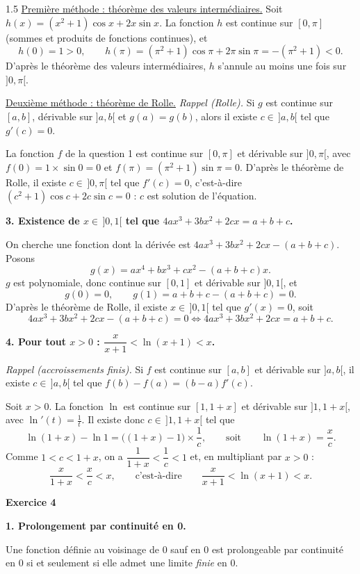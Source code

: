 \documentclass[12pt]{article}
\begin{document}
\begin{spacing}{1.5}
\underline{Première méthode : théorème des valeurs intermédiaires.}
Soit $h(x)=(x^2+1)\cos x+2x\sin x$. La fonction $h$ est continue sur $[0,\pi]$ (sommes et produits de fonctions continues), et
\[
h(0)=1>0,\qquad h(\pi)=(\pi^2+1)\cos\pi+2\pi\sin\pi=-(\pi^2+1)<0 .
\]
D'après le théorème des valeurs intermédiaires, $h$ s'annule au moins une fois sur $]0,\pi[$.

\underline{Deuxième méthode : théorème de Rolle.}
\emph{Rappel (Rolle).} Si $g$ est continue sur $[a,b]$, dérivable sur $]a,b[$ et $g(a)=g(b)$, alors il existe $c\in\,]a,b[$ tel que $g'(c)=0$.

La fonction $f$ de la question 1 est continue sur $[0,\pi]$ et dérivable sur $]0,\pi[$, avec $f(0)=1\times\sin0=0$ et $f(\pi)=(\pi^2+1)\sin\pi=0$. D'après le théorème de Rolle, il existe $c\in\,]0,\pi[$ tel que $f'(c)=0$, c'est-à-dire $(c^2+1)\cos c+2c\sin c=0$ : $c$ est solution de l'équation.

\textbf{3. Existence de $x\in\,]0,1[$ tel que $4ax^3+3bx^2+2cx=a+b+c$.}

On cherche une fonction dont la dérivée est $4ax^3+3bx^2+2cx-(a+b+c)$. Posons
\[
g(x)=ax^4+bx^3+cx^2-(a+b+c)x .
\]
$g$ est polynomiale, donc continue sur $[0,1]$ et dérivable sur $]0,1[$, et
\[
g(0)=0,\qquad g(1)=a+b+c-(a+b+c)=0 .
\]
D'après le théorème de Rolle, il existe $x\in\,]0,1[$ tel que $g'(x)=0$, soit
\[
4ax^3+3bx^2+2cx-(a+b+c)=0\iff 4ax^3+3bx^2+2cx=a+b+c .
\]

\textbf{4. Pour tout $x>0$ : $\dfrac{x}{x+1}<\ln(x+1)<x$.}

\emph{Rappel (accroissements finis).} Si $f$ est continue sur $[a,b]$ et dérivable sur $]a,b[$, il existe $c\in\,]a,b[$ tel que $f(b)-f(a)=(b-a)f'(c)$.

Soit $x>0$. La fonction $\ln$ est continue sur $[1,1+x]$ et dérivable sur $]1,1+x[$, avec $\ln'(t)=\frac1t$. Il existe donc $c\in\,]1,1+x[$ tel que
\[
\ln(1+x)-\ln1=\big((1+x)-1\big)\times\frac1c,\qquad\text{soit}\qquad \ln(1+x)=\frac{x}{c}.
\]
Comme $1<c<1+x$, on a $\dfrac1{1+x}<\dfrac1c<1$ et, en multipliant par $x>0$ :
\[
\frac{x}{1+x}<\frac xc<x,\qquad\text{c'est-à-dire}\qquad\boxed{\frac{x}{x+1}<\ln(x+1)<x}.
\]

\medskip\textbf{Exercice 4}

\textbf{1. Prolongement par continuité en 0.}

Une fonction définie au voisinage de $0$ sauf en $0$ est prolongeable par continuité en $0$ si et seulement si elle admet une limite \emph{finie} en $0$.


\end{spacing}
\end{document}
